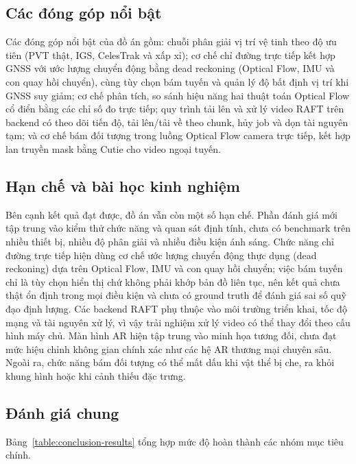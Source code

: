 \documentclass[../DoAn.tex]{subfiles}
\begin{document}
\subsection{Các đóng góp nổi bật}
\label{subsection:6.1.3}
Các đóng góp nổi bật của đồ án gồm: chuỗi phân giải vị trí vệ tinh theo độ ưu tiên (PVT thật, IGS, CelesTrak và xấp xỉ); cơ chế chỉ đường trực tiếp kết hợp GNSS với ước lượng chuyển động bằng dead reckoning (Optical Flow, IMU và con quay hồi chuyển), cùng tùy chọn bám tuyến và quản lý độ bất định vị trí khi GNSS suy giảm; cơ chế phân tích, so sánh hiệu năng hai thuật toán Optical Flow cổ điển bằng các chỉ số đo trực tiếp; quy trình tải lên và xử lý video RAFT trên backend có theo dõi tiến độ, tải lên/tải về theo chunk, hủy job và dọn tài nguyên tạm; và cơ chế bám đối tượng trong luồng Optical Flow camera trực tiếp, kết hợp lan truyền mask bằng Cutie cho video ngoại tuyến.

\subsection{Hạn chế và bài học kinh nghiệm}
\label{subsection:6.1.4}
Bên cạnh kết quả đạt được, đồ án vẫn còn một số hạn chế. Phần đánh giá mới tập trung vào kiểm thử chức năng và quan sát định tính, chưa có benchmark trên nhiều thiết bị, nhiều độ phân giải và nhiều điều kiện ánh sáng. Chức năng chỉ đường trực tiếp hiện dùng cơ chế ước lượng chuyển động thực dụng (dead reckoning) dựa trên Optical Flow, IMU và con quay hồi chuyển; việc bám tuyến chỉ là tùy chọn hiển thị chứ không phải khớp bản đồ liên tục, nên kết quả chưa thật ổn định trong mọi điều kiện và chưa có ground truth để đánh giá sai số quỹ đạo định lượng. Các backend RAFT phụ thuộc vào môi trường triển khai, tốc độ mạng và tài nguyên xử lý, vì vậy trải nghiệm xử lý video có thể thay đổi theo cấu hình máy chủ. Màn hình AR hiện tập trung vào minh họa tương đối, chưa đạt mức hiệu chỉnh không gian chính xác như các hệ AR thương mại chuyên sâu. Ngoài ra, chức năng bám đối tượng có thể mất dấu khi vật thể bị che, ra khỏi khung hình hoặc khi cảnh thiếu đặc trưng.

\subsection{Đánh giá chung}
\label{subsection:6.1.5}
Bảng~\ref{table:conclusion-results} tổng hợp mức độ hoàn thành các nhóm mục tiêu chính.
\end{document}

